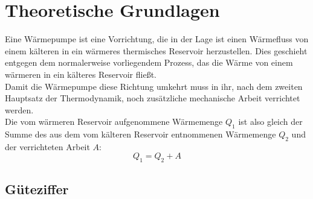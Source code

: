 \section{Theoretische Grundlagen}

Eine Wärmepumpe ist eine Vorrichtung, die in der Lage ist einen Wärmefluss von einem kälteren in ein
wärmeres thermisches Reservoir herzustellen. Dies geschieht entgegen dem normalerweise vorliegendem Prozess,
das die Wärme von einem wärmeren in ein 
kälteres Reservoir fließt.\\
Damit die Wärmepumpe diese Richtung umkehrt muss in ihr,
nach dem zweiten Hauptsatz der Thermodynamik, noch zusätzliche
mechanische Arbeit verrichtet werden.\\
Die vom wärmeren Reservoir aufgenommene Wärmemenge $Q_1$ ist also gleich der
Summe des aus dem vom kälteren Reservoir entnommenen Wärmemenge $Q_2$ und der verrichteten Arbeit $A$:
\begin{equation}
  Q_1 = Q_2 + A  
  \label{eqn:transp}
\end{equation}

\subsection{Güteziffer}

